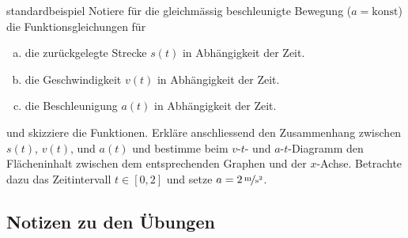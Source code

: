 \documentclass[%
<<<<<<< Updated upstream
<<<<<<< Updated upstream
11pt,%
twoside,%
titlepage,%
german,%
headsepline%
]{scrartcl}
\begin{document}
\begin{uebenv}{standardbeispiel}
Notiere für die gleichmässig beschleunigte Bewegung ($a=\text{konst}$) die Funk\-tions\-glei\-chungen für
\begin{enumerate}[a)]
\item die zurückgelegte Strecke $s(t)$ in Abhängigkeit der Zeit.
\item die Geschwindigkeit $v(t)$ in Abhängigkeit der Zeit.
\item die Beschleunigung $a(t)$ in Abhängigkeit der Zeit.
\end{enumerate}
und skizziere die Funktionen. Erkläre anschliessend den Zusammenhang zwischen $s(t)$, $v(t)$, und $a(t)$ und bestimme beim $v$-$t$- und $a$-$t$-Diagramm den Flächeninhalt zwischen dem entsprechenden Graphen und der $x$-Achse. Betrachte dazu das Zeitintervall $t\in [0,2]$ und setze $a=\unitfrac[2]{m}{s^2}$.
\end{uebenv}

\clearpage

\subsection{Notizen zu den Übungen}
\end{document}
